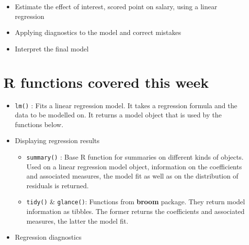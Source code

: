 \documentclass[
]{book}
\providecommand{\tightlist}{%
  \setlength{\itemsep}{0pt}\setlength{\parskip}{0pt}}
\begin{document}
\begin{itemize}
\tightlist
\item
  Estimate the effect of interest, scored point on salary, using a
  linear regression
\item
  Applying diagnostics to the model and correct mistakes
\item
  Interpret the final model
\end{itemize}

\hypertarget{r-functions-covered-this-week-1}{%
\section{R functions covered this week}\label{r-functions-covered-this-week-1}}

\begin{itemize}
\tightlist
\item
  \texttt{lm()} : Fits a linear regression model. It takes a regression
  formula and the data to be modelled on. It returns a model object
  that is used by the functions below.
\item
  Displaying regression results

  \begin{itemize}
  \tightlist
  \item
    \texttt{summary()} : Base R function for summaries on different kinds
    of objects. Used on a linear regression model object,
    information on the coefficients and associated measures, the
    model fit as well as on the distribution of residuals is
    returned.
  \item
    \texttt{tidy()} \& \texttt{glance()}: Functions from \textbf{broom} package. They
    return model information as tibbles. The former returns the
    coefficients and associated measures, the latter the model fit.
  \end{itemize}
\item
  Regression diagnostics


\end{itemize}
\end{document}
